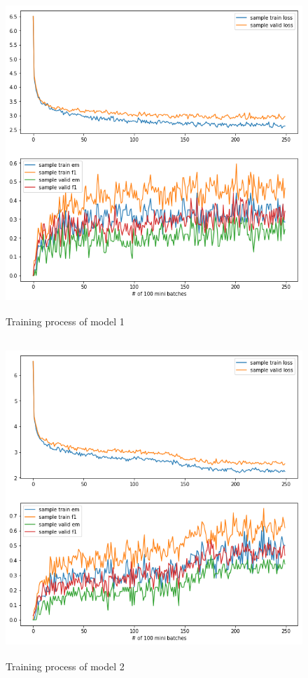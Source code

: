 \documentclass[modernstyle,12pt]{sjsuthesis}
\theoremstyle{definition}
\begin{document}
\begin{figure}[htbp]\centering
  \includegraphics[width=12cm, height=12cm]{figures/match_corrected.png}
  \caption{Training process of model 1}
  \label{f:mlap}
\end{figure}

\begin{figure}[htbp]\centering
  \includegraphics[width=12cm, height=12cm]{figures/match_baseline.png}
  \caption{Training process of model 2}
  \label{f:baseline_change0}
\end{figure}
\end{document}
